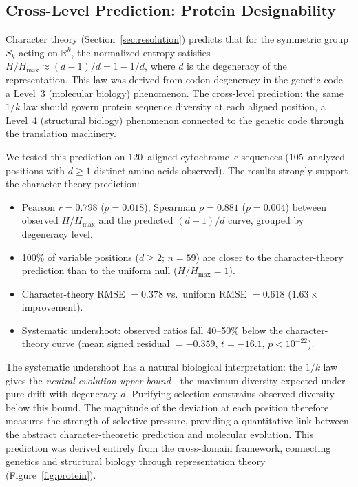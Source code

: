\documentclass[11pt,a4paper]{article}
\begin{document}
\subsection{Cross-Level Prediction: Protein Designability}
\label{sec:protein}

Character theory (Section~\ref{sec:resolution}) predicts that for the symmetric
group $S_k$ acting on $\mathbb{R}^k$, the normalized entropy satisfies
$H / H_{\max} \approx (d - 1)/d = 1 - 1/d$, where $d$ is the degeneracy of
the representation.  This law was derived from codon degeneracy in the genetic
code---a Level~3 (molecular biology) phenomenon.  The cross-level prediction:
the same $1/k$ law should govern protein sequence diversity at each aligned
position, a Level~4 (structural biology) phenomenon connected to the genetic
code through the translation machinery.

We tested this prediction on 120~aligned cytochrome~c sequences
(105~analyzed positions with $d \geq 1$ distinct amino acids observed).
The results strongly support the character-theory prediction:

\begin{itemize}
  \item Pearson $r = 0.798$ ($p = 0.018$), Spearman $\rho = 0.881$
        ($p = 0.004$) between observed $H/H_{\max}$ and the predicted
        $(d-1)/d$ curve, grouped by degeneracy level.
  \item 100\% of variable positions ($d \geq 2$; $n = 59$) are closer to the
        character-theory prediction than to the uniform null ($H/H_{\max} = 1$).
  \item Character-theory RMSE $= 0.378$ vs.\ uniform RMSE $= 0.618$
        ($1.63\times$ improvement).
  \item Systematic undershoot: observed ratios fall 40--50\% below the
        character-theory curve (mean signed residual $= -0.359$,
        $t = -16.1$, $p < 10^{-22}$).
\end{itemize}

The systematic undershoot has a natural biological interpretation: the $1/k$
law gives the \emph{neutral-evolution upper bound}---the maximum diversity
expected under pure drift with degeneracy $d$.  Purifying selection constrains
observed diversity below this bound.  The magnitude of the deviation at each
position therefore measures the strength of selective pressure, providing a
quantitative link between the abstract character-theoretic prediction and
molecular evolution.  This prediction was derived entirely from the
cross-domain framework, connecting genetics and structural biology through
representation theory (Figure~\ref{fig:protein}).
\end{document}
